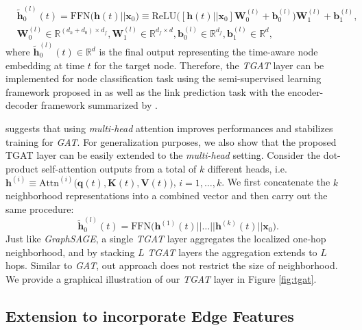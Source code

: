 \documentclass{article} %
\newcommand{\qbf}{\mathbf{q}}
\newcommand{\Kbf}{\mathbf{K}}
\newcommand{\Vbf}{\mathbf{V}}
\newcommand{\Wbf}{\mathbf{W}}
\newcommand{\hbf}{\mathbf{h}}
\newcommand{\bbf}{\mathbf{b}}
\newcommand{\xbf}{\mathbf{x}}
\newcommand{\Rbb}{\mathbb{R}}
\begin{document}
\begin{equation*} 
\begin{split}
& \tilde{\hbf}^{(l)}_{0}(t) = \text{FFN}\Big(\hbf(t) || \xbf_{0} \Big) \equiv \text{ReLU}\Big([\hbf(t) || \xbf_{0}]\Wbf^{(l)}_0 + \bbf^{(l)}_0\Big)\Wbf^{(l)}_1 + \bbf^{(l)}_1, \\ 
& \Wbf^{(l)}_0 \in \Rbb^{(d_h+d_0) \times d_{f}}, \Wbf^{(l)}_1 \in \Rbb^{d_{f}\times d}, \bbf^{(l)}_0 \in \Rbb^{d_f}, \bbf^{(l)}_1 \in \Rbb^d,
\end{split}
\end{equation*}
where $\tilde{\hbf}^{(l)}_0(t) \in \Rbb^d$ is the final output representing the time-aware node embedding at time $t$ for the target node. Therefore, the \textsl{TGAT} layer can be implemented for node classification task using the semi-supervised learning framework proposed in \cite{kipf2016semi} as well as the link prediction task with the encoder-decoder framework summarized by \cite{hamilton2017representation}.

\cite{velivckovic2017graph} suggests that using \textsl{multi-head} attention improves performances and stabilizes training for \textsl{GAT}. For generalization purposes, we also show that the proposed TGAT layer can be easily extended to the \textsl{multi-head} setting. Consider the dot-product self-attention outputs from a total of $k$ different heads, i.e. $\hbf^{(i)} \equiv \text{Attn}^{(i)}\big(\qbf(t), \Kbf(t), \Vbf(t)\big)$, $i=1,\ldots,k$. We first concatenate the $k$ neighborhood representations into a combined vector and then carry out the same procedure:
\[
\tilde{\hbf}^{(l)}_{0}(t) = \text{FFN}\Big(\hbf^{(1)}(t) || \ldots || \hbf^{(k)}(t) || \xbf_{0} \Big).
\]
Just like \textsl{GraphSAGE}, a single \textsl{TGAT} layer aggregates the localized one-hop neighborhood, and by stacking $L$ \textsl{TGAT} layers the aggregation extends to $L$ hops. Similar to \textsl{GAT}, out approach does not restrict the size of neighborhood. We provide a graphical illustration of our \textsl{TGAT} layer in Figure \ref{fig:tgat}.

\subsection{Extension to incorporate Edge Features}
\label{sec:edge-feat}
\end{document}
